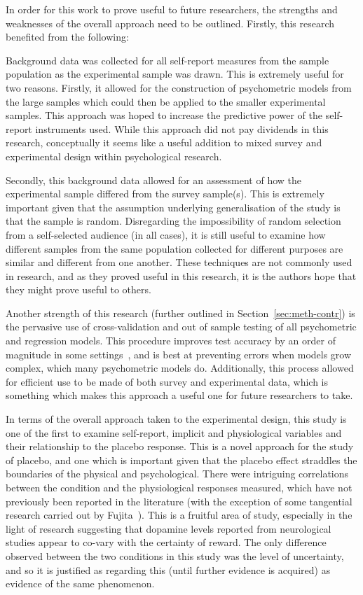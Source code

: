 In order for this work to prove useful to future researchers, the
strengths and weaknesses of the overall approach need to be outlined.
Firstly, this research benefited from the following:


Background data was collected for all self-report measures from the
sample population as the experimental sample was drawn. This is
extremely useful for two reasons. Firstly, it allowed for the
construction of psychometric models from the large samples which could
then be applied to the smaller experimental samples. This approach was
hoped to increase the predictive power of the self-report instruments
used. While this approach did not pay dividends in this research,
conceptually it seems like a useful addition to mixed survey and
experimental design within psychological research.

Secondly, this background data allowed for an assessment of how the
experimental sample differed from the survey sample(s). This is
extremely important given that the assumption underlying
generalisation of the study is that the sample is random. Disregarding
the impossibility of random selection from a self-selected audience
(in all cases), it is still useful to examine how different samples
from the same population collected for different purposes are similar
and different from one another. These techniques are not commonly used
in research, and as they proved useful in this research, it is the
authors hope that they might prove useful to others.

Another strength of this research (further outlined in
Section~\ref{sec:meth-contr}) is the pervasive use of cross-validation
and out of sample testing of all psychometric and regression models.
This procedure improves test accuracy by an order of magnitude in some
settings~\cite{friedman2009elements}, and is best at preventing errors
when models grow complex, which many psychometric models do.
Additionally, this process allowed for efficient use to be made of
both survey and experimental data, which is something which makes this
approach a useful one for future researchers to take.

In terms of the overall approach taken to the experimental design,
this study is one of the first to examine self-report, implicit and
physiological variables and their relationship to the placebo
response. This is a novel approach for the study of placebo, and one
which is important given that the placebo effect straddles the
boundaries of the physical and psychological. There were intriguing
correlations between the condition and the physiological responses
measured, which have not previously been reported in the literature
(with the exception of some tangential research carried out by
Fujita~\cite{Fujita2000}). This is a fruitful area of study,
especially in the light of research suggesting that dopamine levels
reported from neurological studies appear to co-vary with the
certainty of reward. The only difference observed between the two
conditions in this study was the level of uncertainty, and so it is
justified as regarding this (until further evidence is acquired) as
evidence of the same phenomenon.

